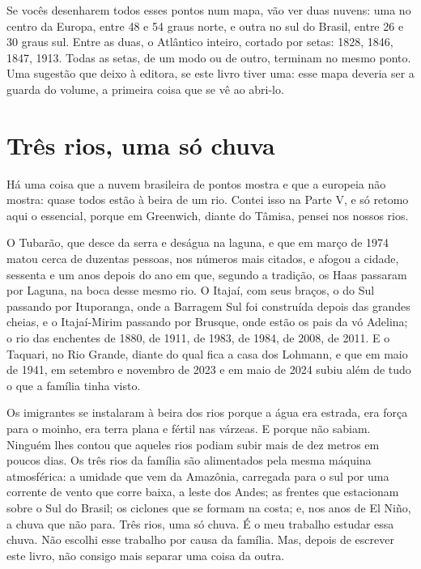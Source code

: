 \documentclass[
  brazilian,
  11pt,
  openany]{book}
\begin{document}
Se vocês desenharem todos esses pontos num mapa, vão ver duas nuvens:
uma no centro da Europa, entre 48 e 54 graus norte, e outra no sul do
Brasil, entre 26 e 30 graus sul. Entre as duas, o Atlântico inteiro,
cortado por setas: 1828, 1846, 1847, 1913. Todas as setas, de um modo ou
de outro, terminam no mesmo ponto. Uma sugestão que deixo à editora, se
este livro tiver uma: esse mapa deveria ser a guarda do volume, a
primeira coisa que se vê ao abri-lo.

\section{Três rios, uma só chuva}\label{truxeas-rios-uma-suxf3-chuva}

Há uma coisa que a nuvem brasileira de pontos mostra e que a europeia
não mostra: quase todos estão à beira de um rio. Contei isso na Parte V,
e só retomo aqui o essencial, porque em Greenwich, diante do Tâmisa,
pensei nos nossos rios.

O Tubarão, que desce da serra e deságua na laguna, e que em março de
1974 matou cerca de duzentas pessoas, nos números mais citados, e afogou
a cidade, sessenta e um anos depois do ano em que, segundo a tradição,
os Haas passaram por Laguna, na boca desse mesmo rio. O Itajaí, com seus
braços, o do Sul passando por Ituporanga, onde a Barragem Sul foi
construída depois das grandes cheias, e o Itajaí-Mirim passando por
Brusque, onde estão os pais da vó Adelina; o rio das enchentes de 1880,
de 1911, de 1983, de 1984, de 2008, de 2011. E o Taquari, no Rio Grande,
diante do qual fica a casa dos Lohmann, e que em maio de 1941, em
setembro e novembro de 2023 e em maio de 2024 subiu além de tudo o que a
família tinha visto.

Os imigrantes se instalaram à beira dos rios porque a água era estrada,
era força para o moinho, era terra plana e fértil nas várzeas. E porque
não sabiam. Ninguém lhes contou que aqueles rios podiam subir mais de
dez metros em poucos dias. Os três rios da família são alimentados pela
mesma máquina atmosférica: a umidade que vem da Amazônia, carregada para
o sul por uma corrente de vento que corre baixa, a leste dos Andes; as
frentes que estacionam sobre o Sul do Brasil; os ciclones que se formam
na costa; e, nos anos de El Niño, a chuva que não para. Três rios, uma
só chuva. É o meu trabalho estudar essa chuva. Não escolhi esse trabalho
por causa da família. Mas, depois de escrever este livro, não consigo
mais separar uma coisa da outra.
\end{document}
